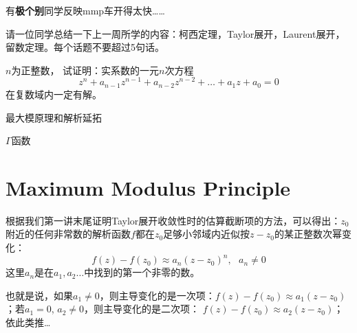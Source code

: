 \documentclass[CJK]{beamer}
\date{}
\begin{document}

\begin{frame}
  \bch
 {\Large 有{\huge \bf 极个别}同学反映mmp车开得太快……}
  \ech
\end{frame}


\begin{frame}

\end{frame}


\begin{frame}


\end{frame}


\begin{frame}
  \bch
  请一位同学总结一下上一周所学的内容：柯西定理，Taylor展开，Laurent展开，留数定理。每个话题不要超过5句话。

  
  \ech
\end{frame}


\begin{frame}
  \bch


  
  $n$为正整数，  试证明：实系数的一元$n$次方程
  $$z^n+a_{n-1}z^{n-1}+a_{n-2}z^{n-2}+\ldots + a_1z + a_0 = 0$$
  在复数域内一定有解。



  \ech
\end{frame}


\begin{frame}
\bch
\bitem
\item{最大模原理和解析延拓}  
\item{$\Gamma$函数}
\eitem
\ech
\end{frame}


\section{Maximum Modulus Principle}

\begin{frame}
  \bch

  
  根据我们第一讲末尾证明Taylor展开收敛性时的估算截断项的方法，可以得出：{\blue $z_0$附近的任何非常数的解析函数$f$都在$z_0$足够小邻域内近似按$z-z_0$的某正整数次幂变化：
  $$f(z)-f(z_0)\approx a_n(z-z_0)^n ,\ \ \  a_n\ne 0$$
  这里$a_n$是在$a_1,a_2\ldots$中找到的第一个非零的数。}


  \skiplines
  
  也就是说，如果$a_1\ne 0$，则主导变化的是一次项：$f(z)- f(z_0) \approx a_1(z-z_0)$；若$a_1 = 0$, $a_2\ne 0$，则主导变化的是二次项：  $f(z)-f(z_0) \approx a_2(z-z_0)$；依此类推…
  \ech
\end{frame}
\end{document}
